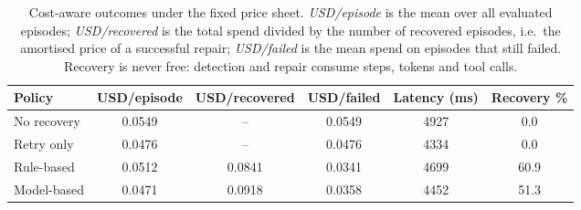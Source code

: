 \begin{table}[t]
\centering\small
\caption{Cost-aware outcomes under the fixed price sheet. \emph{USD/episode}
is the mean over all evaluated episodes; \emph{USD/recovered} is the total spend
divided by the number of recovered episodes, i.e.\ the amortised price of a
successful repair; \emph{USD/failed} is the mean spend on episodes that still
failed. Recovery is never free: detection and repair consume steps, tokens and
tool calls.}
\label{tab:cost}
\begin{adjustbox}{max width=\textwidth}
\begin{tabular}{@{}lccccc@{}}
\toprule
Policy & USD/episode & USD/recovered & USD/failed & Latency (ms) & Recovery \% \\
\midrule
No recovery & 0.0549 & -- & 0.0549 & 4927 & 0.0 \\
Retry only & 0.0476 & -- & 0.0476 & 4334 & 0.0 \\
Rule-based & 0.0512 & 0.0841 & 0.0341 & 4699 & 60.9 \\
Model-based & 0.0471 & 0.0918 & 0.0358 & 4452 & 51.3 \\
\bottomrule
\end{tabular}
\end{adjustbox}
\end{table}
